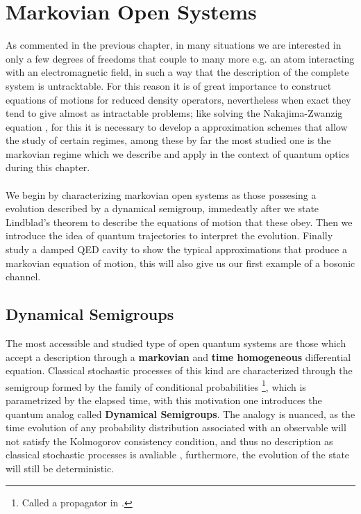\chapter{Markovian Open Systems}
As commented in the previous chapter, in many situations we are interested in only a few degrees of freedoms that couple to many more
e.g. an atom interacting with an electromagnetic field, in such a way that the description of the complete system is untracktable. For this
reason it is of great importance to construct equations of motions for reduced density operators, nevertheless
when exact they tend to give almost as intractable problems; like solving the Nakajima-Zwanzig equation \cite{breuer2002theory}, for this it is
necessary to develop a approximation schemes that allow the study of certain regimes, among these by far the most studied one is the markovian
regime which we describe and apply in the context of quantum optics during this chapter.
\\\\
We begin by characterizing markovian open systems as those possesing a evolution described by a dynamical semigroup, immedeatly after
we state Lindblad's theorem to describe the equations of motion that these obey. Then we introduce the idea of quantum trajectories
to interpret the evolution. Finally study a damped QED cavity to show the typical approximations that produce a markovian equation
of motion, this will also give us our first example of a bosonic channel.

\section{Dynamical Semigroups}
The most accessible and studied type of open quantum systems are those which accept a description through a \textbf{markovian} and \textbf{time
  homogeneous} differential equation. Classical stochastic processes of this kind are characterized through the semigroup
formed by the family of conditional probabilities \footnote{Called a propagator in \cite{breuer2002theory}.}, which is parametrized by the
elapsed time, with this motivation one introduces the quantum analog called \textbf{Dynamical Semigroups}. The analogy is nuanced, as the
time evolution of any probability distribution associated with an observable will not satisfy the Kolmogorov consistency condition, and thus
no description as classical stochastic processes is avaliable \cite{strasberg2022quantum}, furthermore, the evolution of the state
will still be deterministic.

